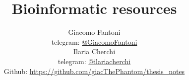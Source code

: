 

\title{\Huge\textbf{Bioinformatic resources}}

\author{
  Giacomo Fantoni \\
  \small telegram: \href{https://t.me/GiacomoFantoni}{@GiacomoFantoni} \\[3pt]
  Ilaria Cherchi \\
  \small telegram: \href{https://t.me/ilariacherchi}{@ilariacherchi} \\[3pt]
\small Github: \href{https://github.com/giacThePhantom/thesis_notes}{https://github.com/giacThePhantom/thesis\_notes}}


\maketitle
\tableofcontents

  
  
  
  
  
  
  
  


